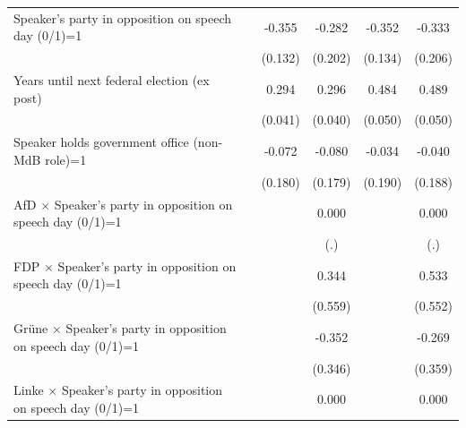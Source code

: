 \begin{table}[htbp]
\begin{tabular}{l*{5}{c}}
\addlinespace
Speaker's party in opposition on speech day (0/1)=1&                     &      -0.355\sym{***}&      -0.282         &      -0.352\sym{***}&      -0.333         \\
                    &                     &     (0.132)         &     (0.202)         &     (0.134)         &     (0.206)         \\
\addlinespace
Years until next federal election (ex post)&                     &       0.294\sym{***}&       0.296\sym{***}&       0.484\sym{***}&       0.489\sym{***}\\
                    &                     &     (0.041)         &     (0.040)         &     (0.050)         &     (0.050)         \\
\addlinespace
Speaker holds government office (non-MdB role)=1&                     &      -0.072         &      -0.080         &      -0.034         &      -0.040         \\
                    &                     &     (0.180)         &     (0.179)         &     (0.190)         &     (0.188)         \\
\addlinespace
AfD $\times$ Speaker's party in opposition on speech day (0/1)=1&                     &                     &       0.000         &                     &       0.000         \\
                    &                     &                     &         (.)         &                     &         (.)         \\
\addlinespace
FDP $\times$ Speaker's party in opposition on speech day (0/1)=1&                     &                     &       0.344         &                     &       0.533         \\
                    &                     &                     &     (0.559)         &                     &     (0.552)         \\
\addlinespace
Grüne $\times$ Speaker's party in opposition on speech day (0/1)=1&                     &                     &      -0.352         &                     &      -0.269         \\
                    &                     &                     &     (0.346)         &                     &     (0.359)         \\
\addlinespace
Linke $\times$ Speaker's party in opposition on speech day (0/1)=1&                     &                     &       0.000         &                     &       0.000         \\

\end{tabular}
\end{table}

